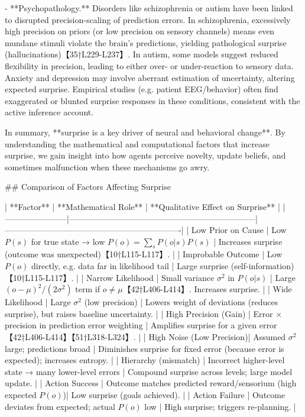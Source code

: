 \documentclass[a4paper]{article}
\begin{document}
    - **Psychopathology.**  Disorders like schizophrenia or autism have been linked to disrupted precision-scaling of prediction errors.  In schizophrenia, excessively high precision on priors (or low precision on sensory channels) means even mundane stimuli violate the brain’s predictions, yielding pathological surprise (hallucinations)【35†L229-L237】.  In autism, some models suggest reduced flexibility in precision, leading to either over- or under-reaction to sensory data.  Anxiety and depression may involve aberrant estimation of uncertainty, altering expected surprise.  Empirical studies (e.g. patient EEG/behavior) often find exaggerated or blunted surprise responses in these conditions, consistent with the active inference account.
    
    In summary, **surprise is a key driver of neural and behavioral change**.  By understanding the mathematical and computational factors that increase surprise, we gain insight into how agents perceive novelty, update beliefs, and sometimes malfunction when these mechanisms go awry.
    
    ## Comparison of Factors Affecting Surprise
    
    | **Factor**            | **Mathematical Role**                                             | **Qualitative Effect on Surprise**                              |
    |-----------------------|--------------------------------------------------------------------|----------------------------------------------------------------|
    | Low Prior on Cause    | Low \(P(s)\) for true state → low \(P(o)=\sum_sP(o|s)P(s)\)        | Increases surprise (outcome was unexpected)【10†L115-L117】.      |
    | Improbable Outcome    | Low \(P(o)\) directly, e.g. data far in likelihood tail           | Large surprise (self-information)【10†L115-L117】.               |
    | Narrow Likelihood     | Small variance \(\sigma^2\) in \(P(o|s)\)                         | Large \((o-\mu)^2/(2\sigma^2)\) term if \(o\neq\mu\)【42†L406-L414】. Increases surprise. |
    | Wide Likelihood       | Large \(\sigma^2\) (low precision)                                 | Lowers weight of deviations (reduces surprise), but raises baseline uncertainty. |
    | High Precision (Gain) | Error × precision in prediction error weighting                   | Amplifies surprise for a given error【42†L406-L414】【51†L318-L324】. |
    | High Noise (Low Precision)| Assumed \(\sigma^2\) large; predictions broad                  | Diminishes surprise for fixed error (because error is expected); increases entropy. |
    | Hierarchy (mismatch)  | Incorrect higher-level state → many lower-level errors            | Compound surprise across levels; large model update.           |
    | Action Success        | Outcome matches predicted reward/sensorium (high expected \(P(o)\))| Low surprise (goals achieved).                                  |
    | Action Failure        | Outcome deviates from expected; actual \(P(o)\) low              | High surprise; triggers re-planning.                           |
    
\end{document}

